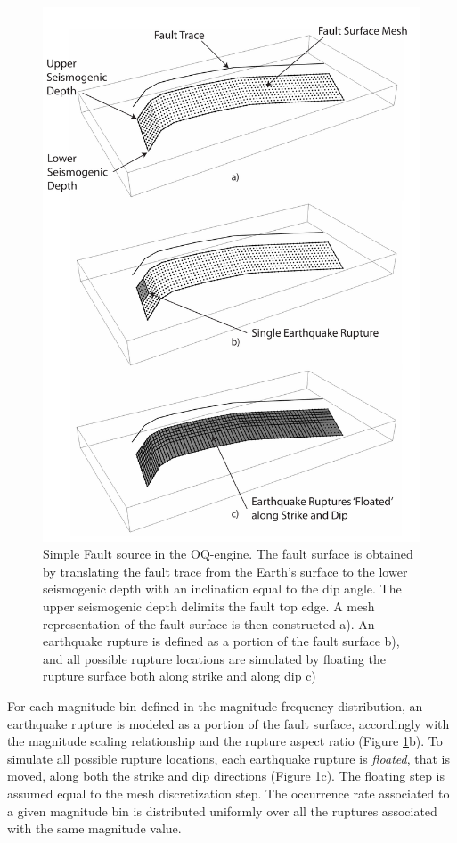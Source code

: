 \begin{figure}
\centering
\includegraphics[width=14cm]{./Pictures/SimpleFaultSource.pdf}
\caption{Simple Fault source in the OQ-engine. The fault surface is obtained by translating the fault trace from the Earth's surface to the lower seismogenic depth with an inclination equal to the dip angle. The upper seismogenic depth delimits the fault top edge. A mesh representation of the fault surface is then constructed a). An earthquake rupture is defined as a portion of the fault surface b), and all possible rupture locations are simulated by floating the rupture surface both along strike and along dip c)}
\label{fig:SimpleFaultSource}
\end{figure}
For each magnitude bin defined in the magnitude-frequency distribution, an earthquake rupture is modeled as a portion of the fault surface, accordingly with the magnitude scaling relationship and the rupture aspect
ratio (Figure \ref{fig:SimpleFaultSource}b). To simulate all possible rupture locations, each earthquake rupture is \textit{floated}, that is moved, along both the strike and dip directions (Figure
\ref{fig:SimpleFaultSource}c). The floating step is assumed equal to the mesh discretization step.
The occurrence rate associated to a given magnitude bin is distributed uniformly over all the ruptures associated with the same magnitude value.
